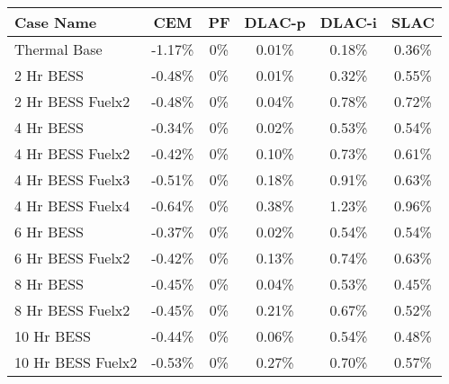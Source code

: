 \begin{tabular}{lccccc}
\toprule
Case Name & CEM & PF & DLAC-p & DLAC-i & SLAC \\
\midrule
Thermal Base & -1.17\% & 0\% & 0.01\% & 0.18\% & 0.36\% \\
2 Hr BESS & -0.48\% & 0\% & 0.01\% & 0.32\% & 0.55\% \\
2 Hr BESS Fuelx2 & -0.48\% & 0\% & 0.04\% & 0.78\% & 0.72\% \\
4 Hr BESS & -0.34\% & 0\% & 0.02\% & 0.53\% & 0.54\% \\
4 Hr BESS Fuelx2 & -0.42\% & 0\% & 0.10\% & 0.73\% & 0.61\% \\
4 Hr BESS Fuelx3 & -0.51\% & 0\% & 0.18\% & 0.91\% & 0.63\% \\
4 Hr BESS Fuelx4 & -0.64\% & 0\% & 0.38\% & 1.23\% & 0.96\% \\
6 Hr BESS & -0.37\% & 0\% & 0.02\% & 0.54\% & 0.54\% \\
6 Hr BESS Fuelx2 & -0.42\% & 0\% & 0.13\% & 0.74\% & 0.63\% \\
8 Hr BESS & -0.45\% & 0\% & 0.04\% & 0.53\% & 0.45\% \\
8 Hr BESS Fuelx2 & -0.45\% & 0\% & 0.21\% & 0.67\% & 0.52\% \\
10 Hr BESS & -0.44\% & 0\% & 0.06\% & 0.54\% & 0.48\% \\
10 Hr BESS Fuelx2 & -0.53\% & 0\% & 0.27\% & 0.70\% & 0.57\% \\
\bottomrule
\end{tabular}
